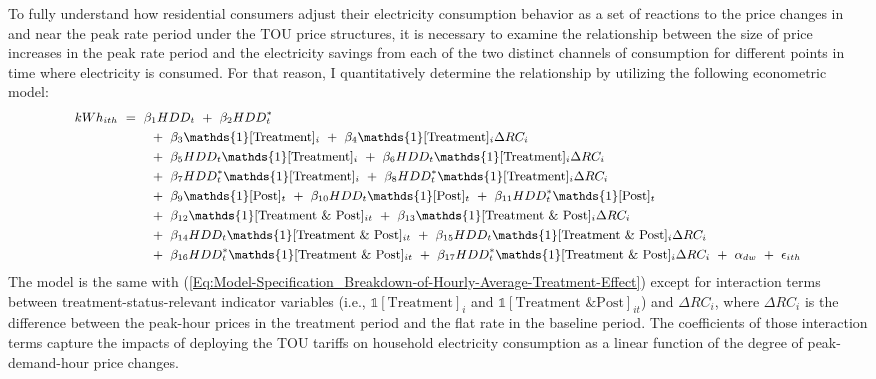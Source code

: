 To fully understand how residential consumers adjust their electricity consumption behavior as a set of reactions to the price changes in and near the peak rate period under the TOU price structures, it is necessary to examine the relationship between the size of price increases in the peak rate period and the electricity savings from each of the two distinct channels of consumption for different points in time where electricity is consumed. For that reason, I quantitatively determine the relationship by utilizing the following econometric model:
\begin{equation}
\small
\begin{split}
    kWh_{ith} \ 
    & = \ \beta_{1} HDD_{t} \ + \ \beta_{2} HDD_{t}^{*} \\
    & \hspace{0.7cm} + \ \beta_{3} \mathds{1}[\text{Treatment}]_{i} \ + \ \beta_{4} \mathds{1}[\text{Treatment}]_{i} \Delta RC_{i} \\
    & \hspace{0.7cm} + \ \beta_{5} HDD_{t} \mathds{1}[\text{Treatment}]_{i} \ + \ \beta_{6} HDD_{t} \mathds{1}[\text{Treatment}]_{i} \Delta RC_{i} \\
    & \hspace{0.7cm} + \ \beta_{7} HDD_{t}^{*} \mathds{1}[\text{Treatment}]_{i} \ + \ \beta_{8} HDD_{t}^{*} \mathds{1}[\text{Treatment}]_{i} \Delta RC_{i} \\
    & \hspace{0.7cm} + \ \beta_{9} \mathds{1}[\text{Post}]_{t} \ + \ \beta_{10} HDD_{t} \mathds{1}[\text{Post}]_{t} \ + \ \beta_{11} HDD_{t}^{*} \mathds{1}[\text{Post}]_{t} \\
    & \hspace{0.7cm} + \ \beta_{12} \mathds{1}[\text{Treatment \& Post}]_{it} \ + \ \beta_{13} \mathds{1}[\text{Treatment \& Post}]_{i} \Delta RC_{i} \\
    & \hspace{0.7cm} + \ \beta_{14} HDD_{t} \mathds{1}[\text{Treatment \& Post}]_{it} \ + \ \beta_{15} HDD_{t} \mathds{1}[\text{Treatment \& Post}]_{i} \Delta RC_{i} \\
    & \hspace{0.7cm} + \ \beta_{16} HDD_{t}^{*} \mathds{1}[\text{Treatment \& Post}]_{it} \ + \ \beta_{17} HDD_{t}^{*} \mathds{1}[\text{Treatment \& Post}]_{i} \Delta RC_{i} \ + \ \alpha_{dw} \ + \ \epsilon_{ith}
\end{split}
\end{equation}
The model is the same with (\ref{Eq:Model-Specification_Breakdown-of-Hourly-Average-Treatment-Effect}) except for interaction terms between treatment-status-relevant indicator variables (i.e., $\mathds{1}[\text{Treatment}]_{i}$ and $\mathds{1}[\text{Treatment \& Post}]_{it}$) and $\Delta RC_{i}$, where $\Delta RC_{i}$ is the difference between the peak-hour prices in the treatment period and the flat rate in the baseline period. The coefficients of those interaction terms capture the impacts of deploying the TOU tariffs on household electricity consumption as a linear function of the degree of peak-demand-hour price changes.

